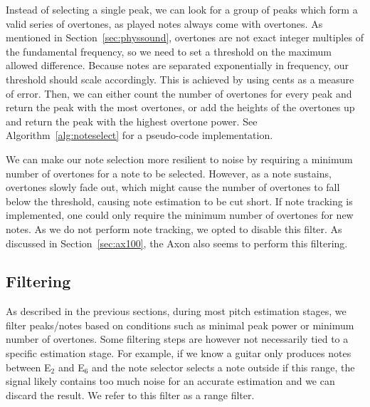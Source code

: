 \documentclass[a4paper,10pt,twocolumn]{article}
\newcommand{\note}[2]{#1${}_{#2}$}
\begin{document}
Instead of selecting a single peak, we can look for a group of peaks which form a valid series of overtones, as played notes always come with overtones. As mentioned in Section~\ref{sec:physsound}, overtones are not exact integer multiples of the fundamental frequency, so we need to set a threshold on the maximum allowed difference. Because notes are separated exponentially in frequency, our threshold should scale accordingly. This is achieved by using cents as a measure of error. Then, we can either count the number of overtones for every peak and return the peak with the most overtones, or add the heights of the overtones up and return the peak with the highest overtone power. See Algorithm~\ref{alg:noteselect} for a pseudo-code implementation.

We can make our note selection more resilient to noise by requiring a minimum number of overtones for a note to be selected. However, as a note sustains, overtones slowly fade out, which might cause the number of overtones to fall below the threshold, causing note estimation to be cut short. If note tracking is implemented, one could only require the minimum number of overtones for new notes. As we do not perform note tracking, we opted to disable this filter. As discussed in Section~\ref{sec:ax100}, the Axon also seems to perform this filtering.




\subsection{Filtering}
As described in the previous sections, during most pitch estimation stages, we filter peaks/notes based on conditions such as minimal peak power or minimum number of overtones. Some filtering steps are however not necessarily tied to a specific estimation stage. For example, if we know a guitar only produces notes between \note{E}{2} and \note{E}{6} and the note selector selects a note outside if this range, the signal likely contains too much noise for an accurate estimation and we can discard the result. We refer to this filter as a range filter.
\end{document}
